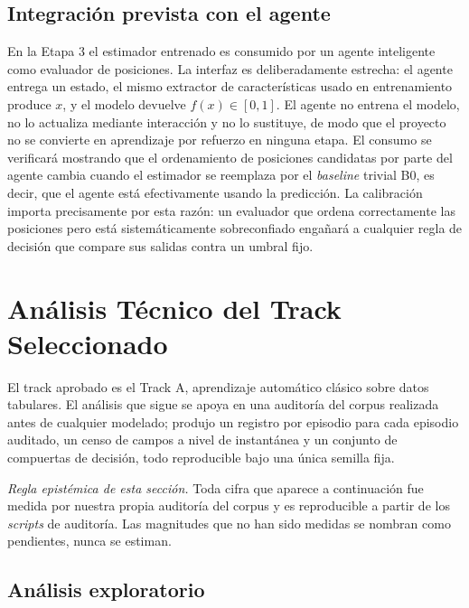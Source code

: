 \documentclass[conference]{IEEEtran}
\begin{document}
\subsection{Integraci\'on prevista con el agente}
\label{subsec:agent}
En la Etapa 3 el estimador entrenado es consumido por un agente inteligente
como evaluador de posiciones. La interfaz es deliberadamente estrecha: el
agente entrega un estado, el mismo extractor de caracter\'isticas usado en
entrenamiento produce $x$, y el modelo devuelve $f(x) \in [0,1]$. El agente
no entrena el modelo, no lo actualiza mediante interacci\'on y no lo
sustituye, de modo que el proyecto no se convierte en aprendizaje por
refuerzo en ninguna etapa. El consumo se verificar\'a mostrando que el
ordenamiento de posiciones candidatas por parte del agente cambia cuando el
estimador se reemplaza por el \emph{baseline} trivial B0, es decir, que el
agente est\'a efectivamente usando la predicci\'on. La calibraci\'on importa
precisamente por esta raz\'on: un evaluador que ordena correctamente las
posiciones pero est\'a sistem\'aticamente sobreconfiado enga\~nar\'a a
cualquier regla de decisi\'on que compare sus salidas contra un umbral fijo.

\section{An\'alisis T\'ecnico del Track Seleccionado}
\label{sec:trackanalysis}

El track aprobado es el Track A, aprendizaje autom\'atico cl\'asico sobre
datos tabulares. El an\'alisis que sigue se apoya en una auditor\'ia del
corpus realizada antes de cualquier modelado; produjo un registro por
episodio para cada episodio auditado, un censo de campos a nivel de
instant\'anea y un conjunto de compuertas de decisi\'on, todo reproducible
bajo una \'unica semilla fija.

\emph{Regla epist\'emica de esta secci\'on.} Toda cifra que aparece a
continuaci\'on fue medida por nuestra propia auditor\'ia del corpus y es
reproducible a partir de los \emph{scripts} de auditor\'ia. Las magnitudes
que no han sido medidas se nombran como pendientes, nunca se estiman.

\subsection{An\'alisis exploratorio}
\label{subsec:eda}
\end{document}
